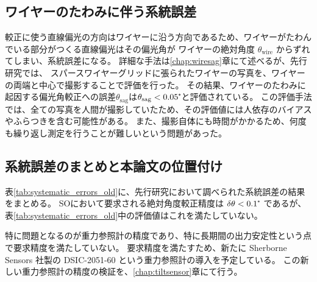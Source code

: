 \documentclass[../../main.tex]{subfiles}
\begin{document}
\subsection{ワイヤーのたわみに伴う系統誤差}
\label{subsec:wg_wiresag}
較正に使う直線偏光の方向はワイヤーに沿う方向であるため、ワイヤーがたわんでいる部分がつくる直線偏光はその偏光角が
ワイヤーの絶対角度 $\theta_{\mathrm{wire}}$ からずれてしまい、系統誤差になる。
詳細な手法は\ref{chap:wiresag}章にて述べるが、先行研究\cite{swg:murata}\cite{swg:iijima}では、
スパースワイヤーグリッドに張られたワイヤーの写真を、ワイヤーの両端と中心で撮影することで評価を行った。
その結果、ワイヤーのたわみに起因する偏光角較正への誤差$\theta_{\mathrm{sag}}$は$\theta_{\mathrm{sag}}<0.05\tcdegree$と評価されている。
この評価手法では、全ての写真を人間が撮影していたため、その評価値には人依存のバイアスやふらつきを含む可能性がある。
また、撮影自体にも時間がかかるため、何度も繰り返し測定を行うことが難しいという問題があった。

\subsection{系統誤差のまとめと本論文の位置付け}
表\ref{tab:systematic_errors_old}に、先行研究において調べられた系統誤差の結果をまとめる。
SOにおいて要求される絶対角度較正精度は $\delta\theta < 0.1\tcdegree$ であるが、
表\ref{tab:systematic_errors_old}中の評価値はこれを満たしていない。

特に問題となるのが重力参照計の精度であり、特に長期間の出力安定性という点で要求精度を満たしていない。
要求精度を満たすため、新たに Sherborne Sensors 社製の DSIC-2051-60 という重力参照計の導入を予定している。
この新しい重力参照計の精度の検証を、\ref{chap:tiltsensor}章にて行う。
\end{document}

